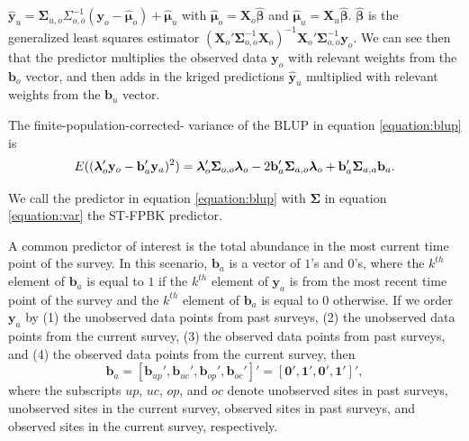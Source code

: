 \documentclass[smallextended]{svjour3}       %
\begin{document}
\(\mathbf{\hat{y}}_{u} = \bm{\Sigma}_{u, o} \Sigma_{o, o}^{-1} (\mathbf{y}_o - \bm{\hat{\mu}}_o) + \bm{\hat{\mu}}_u\)
with \(\bm{\hat{\mu}}_o = \mathbf{X}_o \bm{\hat{\beta}}\) and
\(\bm{\hat{\mu}}_u = \mathbf{X}_u \bm{\hat{\beta}}\).
\(\bm{\hat{\beta}}\) is the generalized least squares estimator
\((\mathbf{X}_o' \bm{\Sigma}_{o, o}^{-1} \mathbf{X}_o)^{-1} \mathbf{X}_o' \bm{\Sigma}_{o, o}^{-1} \mathbf{y}_o\).
We can see then that the predictor multiplies the observed data
\(\mathbf{y}_o\) with relevant weights from the \(\mathbf{b}_o\) vector,
and then adds in the kriged predictions \(\mathbf{\hat{y}}_{u}\)
multiplied with relevant weights from the \(\mathbf{b}_u\) vector.

The finite-population-corrected- variance of the BLUP in equation
\ref{equation:blup} is \mbox{} \begin{equation} \label{equation:predvar}
E((\bm{\lambda}_o'\mathbf{y}_o - \mathbf{b}_a'\mathbf{y}_a)^2) = \\
\bm{\lambda}_o'\bm{\Sigma}_{o, o}\bm{\lambda}_o - 2 \mathbf{b}_a' \bm{\Sigma}_{a, o} \bm{\lambda}_o + \mathbf{b}_a' \bm{\Sigma}_{a, a} \mathbf{b}_a.
\end{equation}

\noindent We call the predictor in equation \ref{equation:blup} with
\(\bm{\Sigma}\) in equation \ref{equation:var} the ST-FPBK predictor.

A common predictor of interest is the total abundance in the most
current time point of the survey. In this scenario, \(\mathbf{b}_a\) is
a vector of \(1\)'s and \(0\)'s, where the \(k^{th}\) element of
\(\mathbf{b}_a\) is equal to \(1\) if the \(k^{th}\) element of
\(\mathbf{y}_a\) is from the most recent time point of the survey and
the \(k^{th}\) element of \(\mathbf{b}_a\) is equal to 0 otherwise. If
we order \(\mathbf{y}_a\) by (1) the unobserved data points from past
surveys, (2) the unobserved data points from the current survey, (3) the
observed data points from past surveys, and (4) the observed data points
from the current survey, then \mbox{}
\begin{equation} \label{equation:currentweights}
\mathbf{b}_a = [\mathbf{b}_{up}', \mathbf{b}_{uc}', \mathbf{b}_{op}', \mathbf{b}_{oc}']' = [\mathbf{0}', \mathbf{1}', \mathbf{0}', \mathbf{1}']',
\end{equation} \noindent where the subscripts \(up\), \(uc\), \(op\),
and \(oc\) denote unobserved sites in past surveys, unobserved sites in
the current survey, observed sites in past surveys, and observed sites
in the current survey, respectively.
\end{document}

